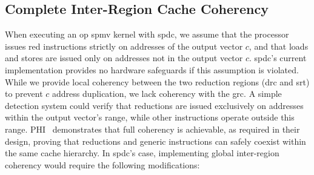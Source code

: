 \subsection{Complete Inter-Region Cache Coherency}
\label{sec:optim:rtloptims:coherency}

When executing an \acrshort{op} \acrshort{spmv} kernel with \acrlong{spdc}, we assume that the processor issues \acrshort{red} instructions strictly on addresses of the output vector $c$, and that loads and stores are issued only on addresses not in the output vector $c$.
\acrlong{spdc}'s current implementation provides no hardware safeguards if this assumption is violated.
While we provide local coherency between the two \gls{reduction} regions (\acrshort{drc} and \acrshort{srt}) to prevent $c$ address duplication, we lack coherency with the \acrshort{grc}.
A simple detection system could verify that \glspl{reduction} are issued exclusively on addresses within the output vector's range, while other instructions operate outside this range.
PHI~\cite{Mukkara2019_PHI} demonstrates that full coherency is achievable, as required in their design, proving that \glspl{reduction} and generic instructions can safely coexist within the same cache hierarchy.
In \acrlong{spdc}'s case, implementing global inter-region coherency would require the following modifications:

